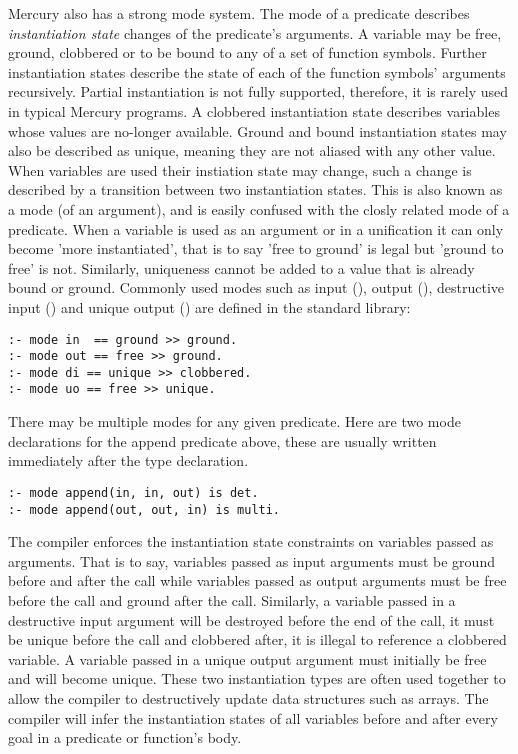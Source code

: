 \noindent
Mercury also has a strong mode system.
The mode of a predicate describes \emph{instantiation state} changes of the
predicate's arguments.
A variable may be free, ground, clobbered or to be bound to any of a set of
function symbols.
Further instantiation states describe the state of each of the function symbols'
arguments recursively.
Partial instantiation is not fully supported,
therefore, it is rarely used in typical Mercury programs.
A clobbered instantiation state describes variables whose values are no-longer
available.
Ground and bound instantiation states may also be described as unique,
meaning they are not aliased with any other value.
When variables are used their instiation state may change,
such a change is described by a transition between two instantiation states.
This is also known as a mode (of an argument),
and is easily confused with the closly related mode of a predicate.
When a variable is used as an argument or in a unification it can only
become 'more instantiated',
that is to say 'free to ground' is legal but 'ground to free' is not.
Similarly, uniqueness cannot be added to a value that is already
bound or ground.
Commonly used modes such as input (), output (),
destructive input () and unique output () are
defined in the standard library:

\begin{verbatim}
:- mode in  == ground >> ground.
:- mode out == free >> ground.
:- mode di == unique >> clobbered.
:- mode uo == free >> unique.
\end{verbatim}

\noindent
There may be multiple modes for any given predicate.
Here are two mode declarations for the append predicate above,
these are usually written immediately after the type declaration.

\begin{verbatim}
:- mode append(in, in, out) is det.
:- mode append(out, out, in) is multi.
\end{verbatim}

\noindent
The compiler enforces the instantiation state constraints on variables passed
as arguments.
That is to say,
variables passed as input arguments must be ground before and after the call
while variables passed as output arguments must be free before the call and
ground after the call.
Similarly, a variable passed in a destructive input argument will be destroyed
before the end of the call,
it must be unique before the call and clobbered after, it is illegal to
reference a clobbered variable.
A variable passed in a unique output argument must initially be free and
will become unique.
These two instantiation types are often used together to allow the compiler to
destructively update data structures such as arrays.
The compiler will infer the instantiation states of all variables before and
after every goal in a predicate or function's body.

